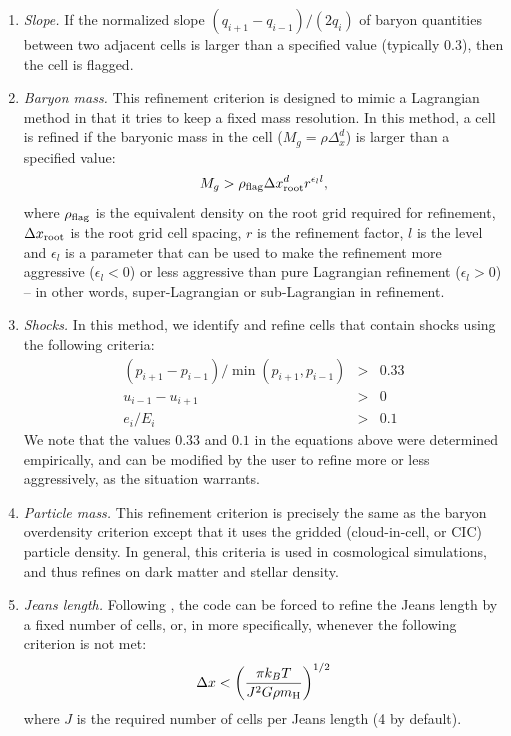 \begin{enumerate}

\item{\em Slope.}  If the normalized slope $(q_{i+1} - q_{i-1})/ (2 q_i)$ of baryon quantities between two adjacent cells is larger than a specified value (typically 0.3), then the cell is flagged.

\item{\em Baryon mass.}  This refinement criterion is designed to mimic a Lagrangian method in that it tries to keep a fixed mass resolution.  In this method, a cell is refined if the baryonic mass in the cell ($M_g = \rho \Delta_x^d$) is larger than a specified value:
\begin{equation}
M_g > \rho_{\rm flag} {\Delta x^d_{\rm root}} r^{\epsilon_l l},
\end{equation}
where $\rho_{\rm flag}$ is the equivalent density on the root grid required for refinement, $\Delta x_{\rm root}$ is the root grid cell spacing, $r$ is the refinement factor, $l$ is the level and $\epsilon_l$ is a parameter that can be used to make the refinement more aggressive ($\epsilon_l < 0$) or less aggressive than pure Lagrangian refinement ($\epsilon_l > 0$) -- in other words, super-Lagrangian or sub-Lagrangian in refinement.

\item{\em Shocks.}  In this method, we identify and refine cells that contain shocks using the following criteria:
\begin{eqnarray}
(p_{i+1} - p_{i-1})/\min(p_{i+1}, p_{i-1}) & > & 0.33  \nonumber \\
u_{i-1} - u_{i+1} & > & 0 \\
e_i / E_i & > & 0.1  \nonumber
\end{eqnarray}
We note that the values $0.33$ and $0.1$ in the equations above were determined empirically, and can be modified by the user to refine more or less aggressively, as the situation warrants.

\item{\em Particle mass.}  This refinement criterion is precisely the same as the baryon overdensity criterion except that it uses the gridded (cloud-in-cell, or CIC) particle density.  In general, this criteria is used in cosmological simulations, and thus refines on dark matter and stellar density.

\item{\em Jeans length.}  Following \cite{Truelove98}, the code can be forced to refine the Jeans length by a fixed number of cells, or, in more specifically, whenever the following criterion is not met:
\begin{equation}
\Delta x < \left( \frac{\pi k_B T}{J^2 G \rho \mh} \right)^{1/2}
\end{equation}
where $J$ is the required number of cells per Jeans length (4 by default).


\end{enumerate}
